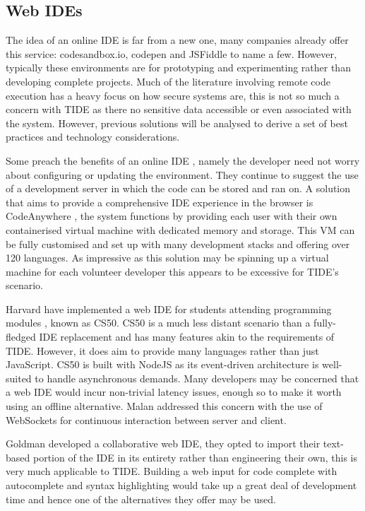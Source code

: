 \documentclass[jou,apacite]{apa6}
\begin{document}
\subsection{Web IDEs}
The idea of an online IDE is far from a new one, many companies already offer this service: codesandbox.io, codepen and JSFiddle to name a few. However, typically these environments are for prototyping and experimenting rather than developing complete projects. Much of the literature involving remote code execution has a heavy focus on how secure systems are, this is not so much a concern with TIDE as there no sensitive data accessible or even associated with the system. However, previous solutions will be analysed to derive a set of best practices and technology considerations.

Some preach the benefits of an online IDE \cite{Aho2011}, namely the developer need not worry about configuring or updating the environment. They continue to suggest the use of a development server in which the code can be stored and ran on. A solution that aims to provide a comprehensive IDE experience in the browser is CodeAnywhere \cite{codeanywhere}, the system functions by providing each user with their own containerised virtual machine with dedicated memory and storage. This VM can be fully customised and set up with many development stacks and offering over 120 languages. As impressive as this solution may be spinning up a virtual machine for each volunteer developer this appears to be excessive for TIDE's scenario. 

Harvard have implemented a web IDE for students attending programming modules \cite{Malan2013}, known as CS50. CS50 is a much less distant scenario than a fully-fledged IDE  replacement and has many features akin to the requirements of TIDE. However, it does aim to provide many languages rather than just JavaScript. CS50 is built with NodeJS as its event-driven architecture is well-suited to handle asynchronous demands. Many developers may be concerned that a web IDE would incur non-trivial latency issues, enough so to make it worth using an offline alternative. Malan addressed this concern with the use of WebSockets for continuous interaction between server and client.

Goldman \cite{Goldman2011} developed a collaborative web IDE, they opted to import their text-based portion of the IDE in its entirety rather than engineering their own, this is very much applicable to TIDE. Building a web input for code complete with autocomplete and syntax highlighting would take up a great deal of development time and hence one of the alternatives they offer may be used. 
\end{document}
